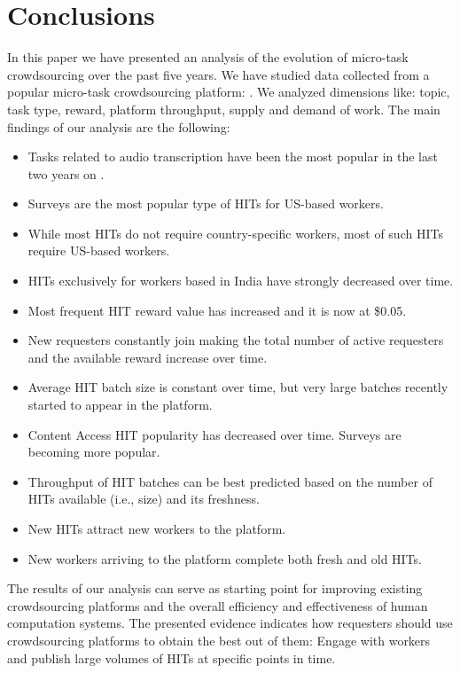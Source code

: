 \section{Conclusions}\label{sec:conc}

In this paper we have presented an analysis of the evolution of micro-task crowdsourcing over the past five years.
We have studied data collected from a popular micro-task crowdsourcing platform: \amt{}.
We analyzed dimensions like: topic, task type, reward, platform throughput, supply and demand of work.
The main findings of our analysis are the following:
\begin{itemize}[noitemsep,topsep=0pt,parsep=0pt,partopsep=0pt]
	\item Tasks related to audio transcription have been the most popular in the last two years on \amt{}.
	\item Surveys are the most popular type of HITs for US-based workers.
	\item While most HITs do not require country-specific workers, most of such HITs require US-based workers.
	\item HITs exclusively for workers based in India have strongly decreased over time.
	\item Most frequent HIT reward value has increased and it is now at \$0.05.
	\item New requesters constantly join \amt{} making the total number of active requesters and the available reward increase over time.
	\item Average HIT batch size is constant over time, but very large batches recently started to appear in the platform.
	\item Content Access HIT popularity has decreased over time. Surveys are becoming more popular.
	\item Throughput of HIT batches can be best predicted based on the number of HITs available (i.e., size)  and its freshness.
	\item New HITs attract new workers to the platform.
	\item New workers arriving to the platform complete both fresh and old HITs.
\end{itemize}

The results of our analysis can serve as starting point for improving existing crowdsourcing platforms and the overall efficiency and effectiveness of human computation systems. The presented evidence  indicates how requesters should use crowdsourcing platforms to obtain the best out of them: Engage with workers and publish large volumes of HITs  at specific points in time. 


